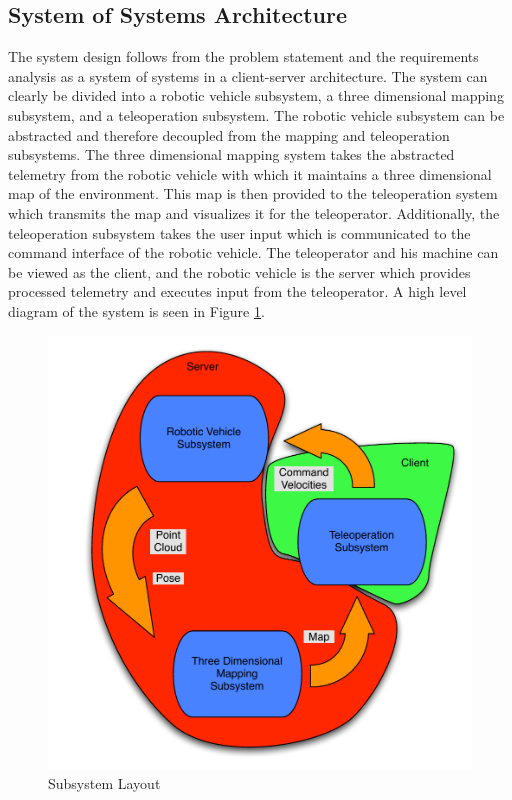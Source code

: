 \documentclass[12pt]{report}
\begin{document}
\subsection{System of Systems Architecture}
The system design follows from the problem statement and the requirements analysis as a system of systems in a client-server architecture.  The system can clearly be divided into a robotic vehicle subsystem, a three dimensional mapping subsystem, and a teleoperation subsystem.  The robotic vehicle subsystem can be abstracted and therefore decoupled from the mapping and teleoperation subsystems.  The three dimensional mapping system takes the abstracted telemetry from the robotic vehicle with which it maintains a three dimensional map of the environment.  This map is then provided to the teleoperation system which transmits the map and visualizes it for the teleoperator.  Additionally, the teleoperation subsystem takes the user input which is communicated to the command interface of the robotic vehicle.  The teleoperator and his machine can be viewed as the client, and the robotic vehicle is the server which provides processed telemetry and executes input from the teleoperator.  A high level diagram of the system is seen in Figure \ref{fig:subsystem}.

\begin{figure}[ht]
  \centering
  \includegraphics[width=5in,keepaspectratio]{subsystem.pdf}
  \caption{Subsystem Layout}
  \label{fig:subsystem}
\end{figure}
\end{document}
